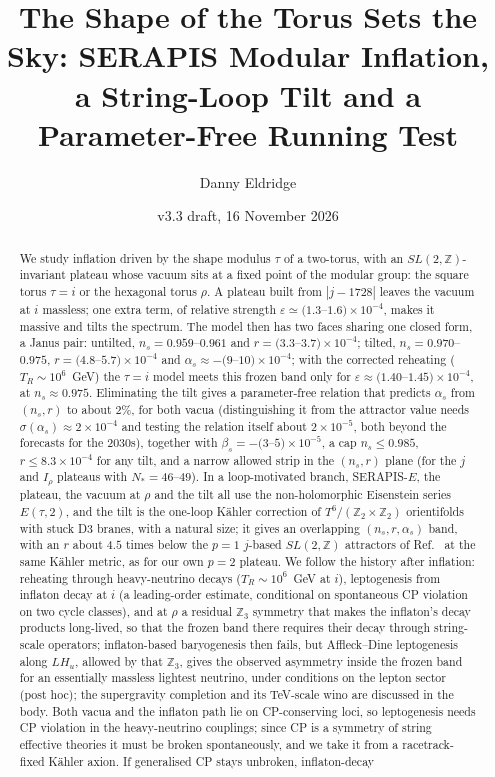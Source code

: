 \documentclass[aps,prd,twocolumn,superscriptaddress,nofootinbib,floatfix]{revtex4-2}
\begin{document}
\title{The Shape of the Torus Sets the Sky: SERAPIS Modular Inflation, a String-Loop Tilt and a Parameter-Free Running Test}
\author{Danny Eldridge}
\date{v3.3 draft, 16 November 2026}
\begin{abstract}
We study inflation driven by the shape modulus $\tau$ of a two-torus, with an $SL(2,\mathbb{Z})$-invariant plateau whose vacuum sits at a fixed point of the modular group: the square torus $\tau=i$ or the hexagonal torus $\rho$. A plateau built from $|j-1728|$ leaves the vacuum at $i$ massless; one extra term, of relative strength $\varepsilon\simeq(1.3$--$1.6)\times10^{-4}$, makes it massive and tilts the spectrum. The model then has two faces sharing one closed form, a Janus pair: untilted, $n_s=0.959$--$0.961$ and $r=(3.3$--$3.7)\times10^{-4}$; tilted, $n_s=0.970$--$0.975$, $r=(4.8$--$5.7)\times10^{-4}$ and $\alpha_s\approx-(9$--$10)\times10^{-4}$; with the corrected reheating ($T_R\sim10^6$~GeV) the $\tau=i$ model meets this frozen band only for $\varepsilon\approx(1.40$--$1.45)\times10^{-4}$, at $n_s\approx0.975$. Eliminating the tilt gives a parameter-free relation that predicts $\alpha_s$ from $(n_s,r)$ to about $2\%$, for both vacua (distinguishing it from the attractor value needs $\sigma(\alpha_s)\approx2\times10^{-4}$ and testing the relation itself about $2\times10^{-5}$, both beyond the forecasts for the 2030s), together with $\beta_s=-(3$--$5)\times10^{-5}$, a cap $n_s\le0.985$, $r\le8.3\times10^{-4}$ for any tilt, and a narrow allowed strip in the $(n_s,r)$ plane (for the $j$ and $I_\rho$ plateaus with $N_*=46$--$49$). In a loop-motivated branch, SERAPIS-$E$, the plateau, the vacuum at $\rho$ and the tilt all use the non-holomorphic Eisenstein series $E(\tau,2)$, and the tilt is the one-loop K\"ahler correction of $T^6/(\mathbb{Z}_2\times\mathbb{Z}_2)$ orientifolds with stuck D3 branes, with a natural size; it gives an overlapping $(n_s,r,\alpha_s)$ band, with an $r$ about $4.5$ times below the $p=1$ $j$-based $SL(2,\mathbb{Z})$ attractors of Ref.~\cite{arXiv_2408_05203} at the same K\"ahler metric, as for our own $p=2$ plateau. We follow the history after inflation: reheating through heavy-neutrino decays ($T_R\sim10^6$~GeV at $i$), leptogenesis from inflaton decay at $i$ (a leading-order estimate, conditional on spontaneous CP violation on two cycle classes), and at $\rho$ a residual $\mathbb{Z}_3$ symmetry that makes the inflaton's decay products long-lived, so that the frozen band there requires their decay through string-scale operators; inflaton-based baryogenesis then fails, but Affleck--Dine leptogenesis along $LH_u$, allowed by that $\mathbb{Z}_3$, gives the observed asymmetry inside the frozen band for an essentially massless lightest neutrino, under conditions on the lepton sector (post hoc); the supergravity completion and its TeV-scale wino are discussed in the body. Both vacua and the inflaton path lie on CP-conserving loci, so leptogenesis needs CP violation in the heavy-neutrino couplings; since CP is a symmetry of string effective theories it must be broken spontaneously, and we take it from a racetrack-fixed K\"ahler axion. If generalised CP stays unbroken, inflaton-decay 
\end{abstract}
\end{document}
